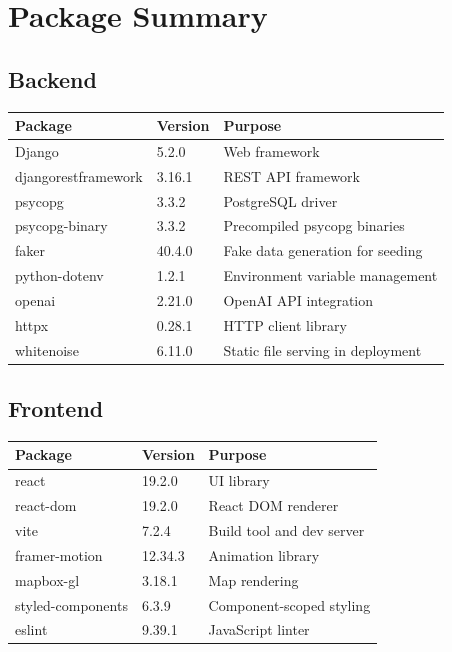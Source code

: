 \documentclass[a4paper, 12pt]{report}
\begin{document}
\chapter{Package Summary}

\section{Backend}

\begin{center}
\begin{longtable}{lll}
\toprule
\textbf{Package} & \textbf{Version} & \textbf{Purpose} \\
\midrule
Django              & 5.2.0  & Web framework \\
djangorestframework & 3.16.1 & REST API framework \\
psycopg             & 3.3.2  & PostgreSQL driver \\
psycopg-binary      & 3.3.2  & Precompiled psycopg binaries \\
faker               & 40.4.0 & Fake data generation for seeding \\
python-dotenv       & 1.2.1  & Environment variable management \\
openai              & 2.21.0 & OpenAI API integration \\
httpx               & 0.28.1 & HTTP client library \\
whitenoise          & 6.11.0 & Static file serving in deployment \\
\bottomrule
\end{longtable}
\end{center}

\section{Frontend}

\begin{center}
\begin{longtable}{lll}
\toprule
\textbf{Package} & \textbf{Version} & \textbf{Purpose} \\
\midrule
react           & 19.2.0  & UI library \\
react-dom       & 19.2.0  & React DOM renderer \\
vite            & 7.2.4   & Build tool and dev server \\
framer-motion   & 12.34.3 & Animation library \\
mapbox-gl       & 3.18.1  & Map rendering \\
styled-components & 6.3.9 & Component-scoped styling \\
eslint          & 9.39.1  & JavaScript linter \\
\bottomrule
\end{longtable}
\end{center}
\end{document}
